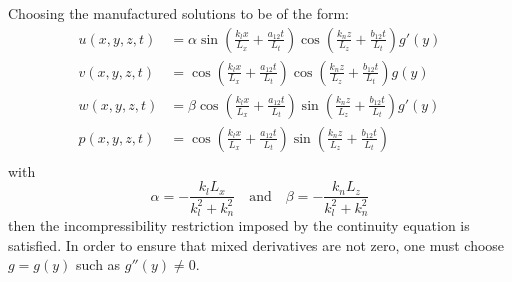 \documentclass[10pt]{article}
\begin{document}
Choosing the manufactured solutions to be of the form:
\begin{equation}
\begin{split}\label{eq:uvw01}
u(x,y,z,t)&= \alpha \sin\left( \frac{k_l x}{L_x} + \frac{a_{12}t}{L_t} \right) \cos\left( \frac{k_n z}{L_z} + \frac{b_{12}t}{L_t} \right) g'(y)\\
v(x,y,z,t)&=        \cos\left( \frac{k_l x}{L_x} + \frac{a_{12}t}{L_t} \right) \cos\left( \frac{k_n z}{L_z} + \frac{b_{12}t}{L_t} \right) g(y)\\ 
w(x,y,z,t)&=  \beta \cos\left( \frac{k_l x}{L_x} + \frac{a_{12}t}{L_t} \right) \sin\left( \frac{k_n z}{L_z} + \frac{b_{12}t}{L_t} \right) g'(y)\\
p(x,y,z,t)&=  \cos\left( \frac{k_l x}{L_x} + \frac{a_{12}t}{L_t} \right) \sin\left( \frac{k_n z}{L_z} + \frac{b_{12}t}{L_t} \right) \\
\end{split}
\end{equation}
with
\begin{equation}\label{eq:ab01}
\alpha = -\dfrac{k_l L_x}{k_l^2+ k_n^2}\quad\mbox{and}\quad \beta = -\dfrac{k_n L_z}{k_l^2+ k_n^2} 
\end{equation}
then the incompressibility restriction imposed by the continuity equation is satisfied. In order to ensure that mixed derivatives are not zero, one must choose $g=g(y)$ such as $g''(y) \neq 0$.

% 
\end{document}
